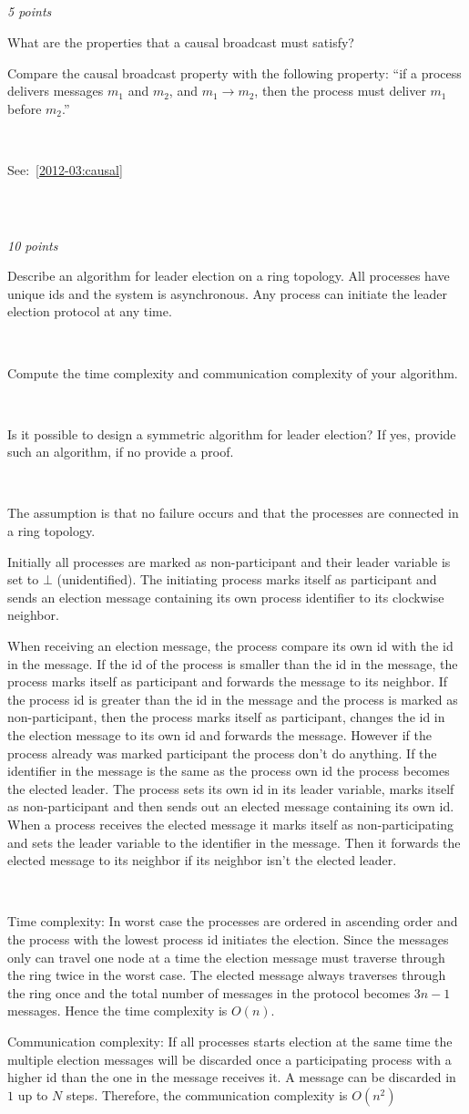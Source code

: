 \documentclass[a4paper]{article}
\newcommand{\points}[1]{\subsection{} \textit{#1 points}\\}
\newcommand{\question}[2][]{
  \parbox[t]{\textwidth}{
    \ifthenelse{\equal{#1}{}}{}{#1)}
    \parbox[t]{0.95\textwidth}{#2}}\\}
\newcommand{\solution}[2][]{
  \ifthenelse{\equal{#1}{} \or \equal{#1}{a}}{\\[3pt]\textit{Solution: }\\[0.1cm]}{}
  \parbox[t]{\textwidth}{
    \ifthenelse{\equal{#1}{}}{}{#1)}
    \parbox[t]{0.95\textwidth}{#2}}\\
}
\begin{document}
\points{5}
\question{
  What are the properties that a causal broadcast must satisfy?

  Compare the causal broadcast property with the following property:
  ``if a process delivers messages $m_1$ and $m_2$, and $m_1 \rightarrow
  m_2$, then the process must deliver $m_1$ before $m_2$.''
}
\solution{See:~\ref{2012-03:causal}}
%
\points{10}
\question[a]{
  Describe an algorithm for leader election on a ring topology. All
  processes have unique ids and the system is asynchronous. Any process
  can initiate the leader election protocol at any time.
}
\question[b]{
Compute the time complexity and communication complexity of
  your algorithm.
}
\question[c]{
  Is it possible to design a symmetric algorithm for leader
  election? If yes, provide such an algorithm, if no provide a proof.
}
%
\solution[a]{
  The assumption is that no failure occurs and that the processes are
  connected in a ring topology.

  Initially all processes are marked as non-participant and their leader
  variable is set to $\bot$ (unidentified). The initiating process marks
  itself as participant and sends an election message containing its own
  process identifier to its clockwise neighbor.

  When receiving an election message, the process compare its own id
  with the id in the message. If the id of the process is smaller than
  the id in the message, the process marks itself as participant and
  forwards the message to its neighbor. If the process id is greater
  than the id in the message and the process is marked as
  non-participant, then the process marks itself as participant, changes
  the id in the election message to its own id and forwards the
  message. However if the process already was marked participant the
  process don't do anything. If the identifier in the message is the
  same as the process own id the process becomes the elected leader. The
  process sets its own id in its leader variable, marks itself as
  non-participant and then sends out an elected message containing its
  own id. When a process receives the elected message it marks itself as
  non-participating and sets the leader variable to the identifier in the
  message. Then it forwards the elected message to its neighbor if its
  neighbor isn't the elected leader.
}
\solution[b]{
  Time complexity:
  In worst case the processes are ordered in ascending order and the
  process with the lowest process id initiates the election. Since the
  messages only can travel one node at a time the election message must
  traverse through the ring twice in the worst case. The elected message
  always traverses through the ring once and the total number of
  messages in the protocol becomes $3n-1$ messages.  Hence the time
  complexity is $O(n)$.

  Communication complexity:
  If all processes starts election at the same time the multiple
  election messages will be discarded once a participating process with
  a higher id than the one in the message receives it. A message can be
  discarded in $1$ up to $N$ steps.  Therefore, the communication
  complexity is $O(n^2)$
}
\end{document}
